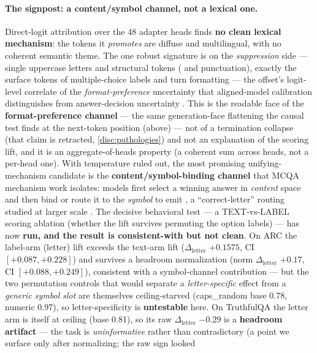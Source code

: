 \paragraph{The signpost: a content/symbol channel, not a lexical one.}
Direct-logit attribution over the 48 adapter heads finds \textbf{no clean lexical
mechanism}: the tokens it \emph{promotes} are diffuse and multilingual, with no
coherent semantic theme. The one robust signature is on the \emph{suppression} side
--- single uppercase letters and structural tokens ( and punctuation), exactly the surface tokens of multiple-choice
labels and turn formatting --- the offset's logit-level correlate of the
\emph{format-preference} uncertainty that aligned-model calibration distinguishes
from answer-decision uncertainty \citep{AlignedMCCalibration}. This is the readable
face of the \textbf{format-preference channel} --- the same generation-face
flattening the causal test finds at the next-token position (above) --- not of a
termination collapse (that claim is retracted, \cref{disc:pathologies}) and not an
explanation of the scoring lift, and it is an aggregate-of-heads property (a
coherent sum across heads, not a per-head one). With temperature ruled out, the
most promising unifying-mechanism candidate is the \textbf{content/symbol-binding
channel} that MCQA mechanism work isolates: models first select a winning answer in
\emph{content} space and then bind or route it to the \emph{symbol} to emit
\citep{TwoStageMCQA}, a ``correct-letter'' routing studied at larger scale
\citep{CorrectLetterHeads}. The decisive behavioral test --- a TEXT-vs-LABEL
scoring ablation (whether the lift survives permuting the option labels) --- has
now \textbf{run, and the result is consistent-with but not clean}. On ARC the
label-arm (letter) lift exceeds the text-arm lift ($\Delta_{\mathrm{letter}}$
$+0.1575$, CI $[+0.087, +0.228]$) and survives a headroom normalization (norm
$\Delta_{\mathrm{letter}}$ $+0.17$, CI $[+0.088, +0.249]$), consistent with a
symbol-channel contribution --- but the two permutation controls that would
separate a \emph{letter-specific} effect from a \emph{generic symbol slot} are
themselves ceiling-starved (caps\_random base 0.78, numeric 0.97), so
letter-specificity is \textbf{untestable} here. On TruthfulQA the letter arm is
itself at ceiling (base 0.81), so its raw $\Delta_{\mathrm{letter}}$ $-0.29$ is a
\textbf{headroom artifact} --- the task is \emph{uninformative} rather than
contradictory (a point we surface only after normalizing; the raw sign looked
